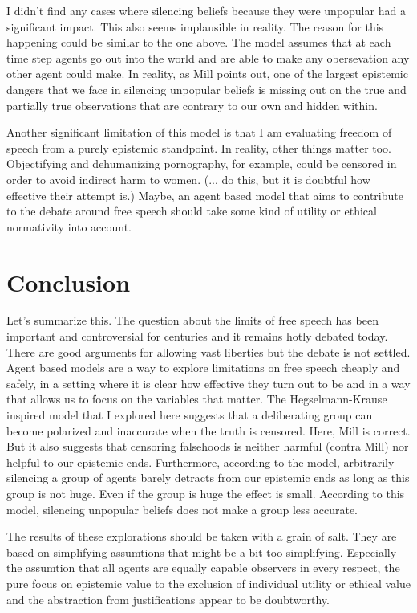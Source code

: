 \documentclass{essay-formal}
\begin{document}
I didn't find any cases where silencing beliefs because they were unpopular had a significant impact. This also seems implausible in reality. The reason for this happening could be similar to the one above. The model assumes that at each time step agents go out into the world and are able to make any obersevation any other agent could make. In reality, as Mill points out, one of the largest epistemic dangers that we face in silencing unpopular beliefs is missing out on the true and partially true observations that are contrary to our own and hidden within.

Another significant limitation of this model is that I am evaluating freedom of speech from a purely epistemic standpoint. In reality, other things matter too. Objectifying and dehumanizing pornography, for example, could be censored in order to avoid indirect harm to women. (... do this, but it is doubtful how effective their attempt is.) Maybe, an agent based model that aims to contribute to the debate around free speech should take some kind of utility or ethical normativity into account.

\section{Conclusion}

Let's summarize this. The question about the limits of free speech has been important and controversial for centuries and it remains hotly debated today. There are good arguments for allowing vast liberties but the debate is not settled. Agent based models are a way to explore limitations on free speech cheaply and safely, in a setting where it is clear how effective they turn out to be and in a way that allows us to focus on the variables that matter. The Hegselmann-Krause inspired model that I explored here suggests that a deliberating group can become polarized and inaccurate when the truth is censored. Here, Mill is correct. But it also suggests that censoring falsehoods is neither harmful (contra Mill) nor helpful to our epistemic ends. Furthermore, according to the model, arbitrarily silencing a group of agents barely detracts from our epistemic ends as long as this group is not huge. Even if the group is huge the effect is small. According to this model, silencing unpopular beliefs does not make a group less accurate.

The results of these explorations should be taken with a grain of salt. They are based on simplifying assumtions that might be a bit too simplifying. Especially the assumtion that all agents are equally capable observers in every respect, the pure focus on epistemic value to the exclusion of individual utility or ethical value and the abstraction from justifications appear to be doubtworthy.
\end{document}
